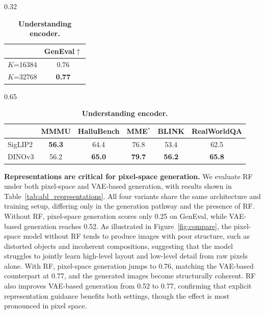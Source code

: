 \begin{table}[t]
\noindent
\begin{subtable}[t]{0.32\textwidth}
\centering
\small
\caption{\textbf{Rep.\ token codebook size.}}
\label{tab:abl_codebook}
\begin{tabular}{lc}
\toprule
 & GenEval$\uparrow$ \\
\midrule
$K$=16384 & 0.76 \\
$K$=32768 & \textbf{0.77} \\
\bottomrule
\end{tabular}
\end{subtable}
\hfill
\begin{subtable}[t]{0.65\textwidth}
\small
\setlength{\tabcolsep}{3pt}
\caption{\textbf{Understanding encoder.}}
\label{tab:abl_encoder}
\begin{tabular}{lccccc}
\toprule
 & MMMU & HalluBench & MME$^*$ & BLINK & RealWorldQA \\
\midrule
SigLIP2 & \textbf{56.3} & 64.4 & 76.8 & 53.4 & 62.5 \\
DINOv3 & 56.2 & \textbf{65.0} & \textbf{79.7} & \textbf{56.2} & \textbf{65.8} \\
\bottomrule
\end{tabular}
\end{subtable}
\end{table}




\textbf{Representations are critical for pixel-space generation.}
We evaluate RF under both pixel-space and VAE-based generation, with results shown in Table~\ref{tab:abl_representations}. All four variants share the same architecture and training setup, differing only in the generation pathway and the presence of RF. Without RF, pixel-space generation scores only 0.25 on GenEval, while VAE-based generation reaches 0.52. As illustrated in Figure~\ref{fig:compare}, the pixel-space model without RF tends to produce images with poor structure, such as distorted objects and incoherent compositions, suggesting that the model struggles to jointly learn high-level layout and low-level detail from raw pixels alone. With RF, pixel-space generation jumps to 0.76, matching the VAE-based counterpart at 0.77, and the generated images become structurally coherent. RF also improves VAE-based generation from 0.52 to 0.77, confirming that explicit representation guidance benefits both settings, though the effect is most pronounced in pixel space.




